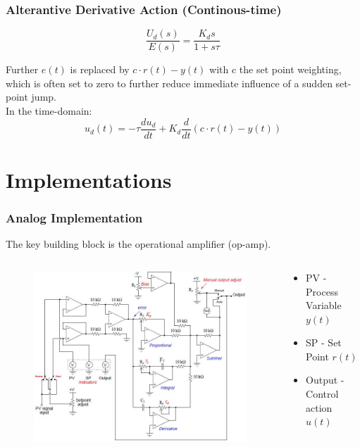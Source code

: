 \begin{frame}
	\frametitle{Alterantive Derivative Action (Continous-time)}
	\begin{equation*}
		\frac{U_d(s)}{E(s)} = \frac{K_d s}{1+s\tau}
	\end{equation*}
	
	Further $e(t)$ is replaced by $c\cdot r(t)-y(t)$ with c the set point weighting, which is often set to zero to further reduce immediate influence of a sudden set-point jump. \\
	\vspace{1em}
	In the time-domain:
	\begin{equation*}
		u_d(t) = -\tau\frac{du_d}{dt} + K_d \frac{d}{dt}(c\cdot r(t)-y(t))
	\end{equation*}
\end{frame}

\section{Implementations}

\begin{frame}
	\frametitle{Analog Implementation}
	The key building block is the operational amplifier (op-amp).
	\begin{columns}
		\begin{column}{0.7 \textwidth}
			\begin{figure}
				\includegraphics[width=1\linewidth]{img/Principles_of_Feedback_Control_Fig_079}
			\end{figure}
		\end{column}
		\begin{column}{0.3 \textwidth}
			\footnotesize{
				\begin{itemize}
					\item PV - Process Variable $y(t)$
					\item SP - Set Point $r(t)$
					\item Output - Control action $u(t)$
				\end{itemize}
			}
		\end{column}
	\end{columns}
\end{frame}

